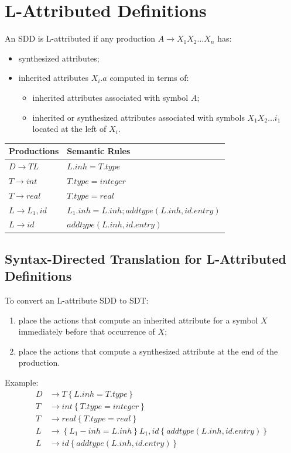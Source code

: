 \section{L-Attributed Definitions}
An SDD is L-attributed if any production $A \to X_1 X_2 \ldots X_n$ has:
\begin{itemize}
    \item synthesized attributes;
    \item inherited attributes $X_i.a$ computed in terms of:
    \begin{itemize}
        \item inherited attributes associated with symbol $A$;
        \item inherited or synthesized attributes associated with symbols $X_1 X_2 \ldots i_1$ located at the left of $X_i$.
    \end{itemize}
\end{itemize}

\begin{table}[h]
    \centering
    \begin{tabular}{l|l}
        Productions & Semantic Rules \\ \hline
        $D \to TL$ & $L.inh = T.type$ \\ \hline
        $T \to int$ & $T.type = integer$ \\ \hline
        $T \to real$ & $T.type = real$ \\ \hline
        $L \to L_1, id$ & $L_1.inh = L.inh; addtype(L.inh, id.entry)$ \\ \hline
        $L \to id$ & $addtype(L.inh, id.entry)$
    \end{tabular}
\end{table}

\subsection{Syntax-Directed Translation for L-Attributed Definitions}
To convert an L-attribute SDD to SDT:
\begin{enumerate}
    \item place the actions that compute an inherited attribute for a symbol $X$ immediately before that occurrence of $X$;
    \item place the actions that compute a synthesized attribute at the end of the production.
\end{enumerate}
Example:
\begin{align*}
    D &\to T \left\{L.inh = T.type\right\} \\
    T &\to int \left\{T.type = integer\right\} \\
    T &\to real \left\{T.type = real\right\} \\
    L &\to \left\{L_1-inh = L.inh\right\}L_1, id\left\{addtype(L.inh, id.entry)\right\} \\
    L &\to id \left\{addtype(L.inh, id.entry)\right\}
\end{align*}

